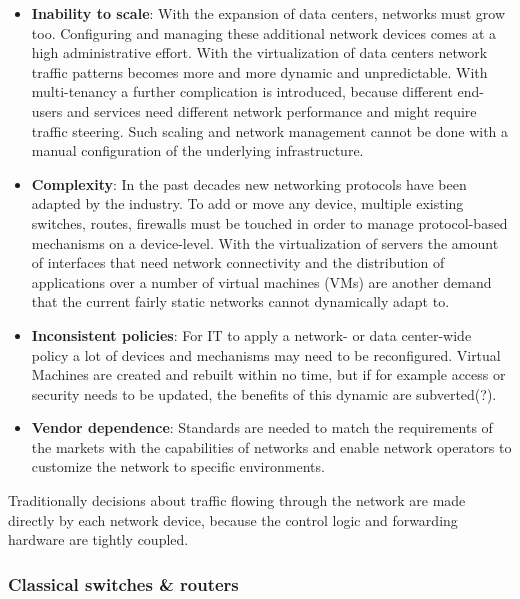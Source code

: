 \begin{itemize}
\item \textbf{Inability to scale}: With the expansion of data centers, networks must grow too. Configuring and managing these additional network devices comes at a high administrative effort. With the virtualization of data centers network traffic patterns becomes more and more dynamic and unpredictable. With multi-tenancy a further complication is introduced, because different end-users and services need different network performance and might require traffic steering. Such scaling and network management cannot be done with a manual configuration of the underlying infrastructure.
\item \textbf{Complexity}: In the past decades new networking protocols have been adapted by the industry. To add or move any device, multiple existing switches, routes, firewalls must be touched in order to manage protocol-based mechanisms on a device-level. With the virtualization of servers the amount of interfaces that need network connectivity and the distribution of applications over a number of virtual machines (VMs) are another demand that the current fairly static networks cannot dynamically adapt to.
\item \textbf{Inconsistent policies}: For IT to apply a network- or data center-wide policy a lot of devices and mechanisms may need to be reconfigured. Virtual Machines are created and rebuilt within no time, but if for example access or security needs to be updated, the benefits of this dynamic are subverted(?).
\item \textbf{Vendor dependence}: Standards are needed to match the requirements of the markets with the capabilities of networks and enable network operators to customize the network to specific environments.
\end{itemize}

Traditionally decisions about traffic flowing through the network are made directly by each network device, because the control logic and forwarding hardware are tightly coupled.

\subsubsection{Classical switches \& routers}

